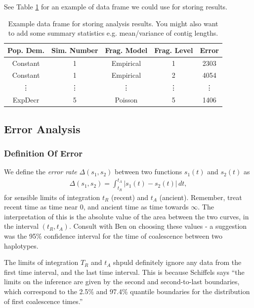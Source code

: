 \documentclass[11pt,a4paper]{article}
\begin{document}
See Table \ref{df} for an example of data frame we could use for storing results.
\begin{table}[h]
	\caption{Example data frame for storing analysis results. You might also want to add some summary statistics e.g. mean/variance of contig lengths.}
	\begin{center}
		\begin{tabular}{ccccc}
			\hline
			\textbf{Pop. Dem.} & \textbf{Sim. Number} & \textbf{Frag. Model} & \textbf{Frag. Level} & \textbf{Error} \\
                        \hline
                        Constant & 1 & Empirical & 1 & 2303 \\
                        Constant & 1 & Empirical & 2 & 4054 \\
                        \vdots & \vdots & \vdots & \vdots & \vdots \\
                        ExpDecr & 5 & Poisson & 5 & 1406 \\ \hline
		\end{tabular}
	\end{center} \label{df}
\end{table}


\subsection{Error Analysis}

\subsubsection{Definition Of Error}
We define the \emph{error rate} $\Delta (s_1,s_2)$ between two functions $s_1(t)$ and $s_2(t)$ as 
\begin{eqnarray}
\Delta (s_1,s_2) = \int_{t_R}^{t_A} |s_1(t)-s_2(t)| \,dt, \label{errorRate}
\end{eqnarray}
for sensible limits of integration $t_R$ (recent) and $t_A$ (ancient). Remember, treat recent time as time near 0, and ancient time as time towards $\infty$. The interpretation of this is the absolute value of the area between the two curves, in the interval $(t_R,t_A)$. Consult with Ben on choosing these values - a suggestion was the 95\% confidence interval for the time of coalescence between two haplotypes.

The limits of integration $T_R$ and $t_A$ shpuld definitely ignore any data from the first time interval, and the last time interval. This is because Schiffels says \cite{schiffels2014inferring} ``the limits on the inference are given by the second and second-to-last boundaries, which correspond to the 2.5\% and 97.4\% quantile boundaries for the distribution of first coalescence times.''
\end{document}
